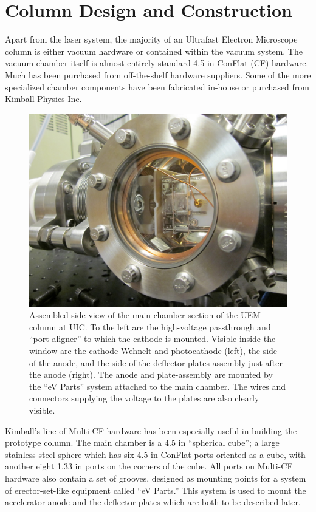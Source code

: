
\section{Column Design and Construction}

Apart from the laser system, the majority of an Ultrafast Electron Microscope column is either vacuum hardware or contained within the vacuum system.
The vacuum chamber itself is almost entirely standard 4.5 in ConFlat (CF) hardware.
Much has been purchased from off-the-shelf hardware suppliers.
Some of the more specialized chamber components have been fabricated in-house or purchased from Kimball Physics Inc.

\begin{figure}
  \centering
  \includegraphics{chamber.jpg}
  \caption[Side view of main chamber]{
    Assembled side view of the main chamber section of the UEM column at UIC.
    To the left are the high-voltage passthrough and ``port aligner'' to which the cathode is mounted.
    Visible inside the window are the cathode Wehnelt and photocathode (left), the side of the anode, and the side of the deflector plates assembly just after the anode (right).
    The anode and plate-assembly are mounted by the ``eV Parts'' system attached to the main chamber.
    The wires and connectors supplying the voltage to the plates are also clearly visible.
  }
  \label{fig:chamber-pic}
\end{figure}

Kimball's line of Multi-CF hardware has been especially useful in building the prototype column.
The main chamber is a 4.5 in ``spherical cube''; a large stainless-steel sphere which has six 4.5 in ConFlat ports oriented as a cube, with another eight 1.33 in ports on the corners of the cube.
All ports on Multi-CF hardware also contain a set of grooves, designed as mounting points for a system of erector-set-like equipment called ``eV Parts.''
This system is used to mount the accelerator anode and the deflector plates which are both to be described later.


